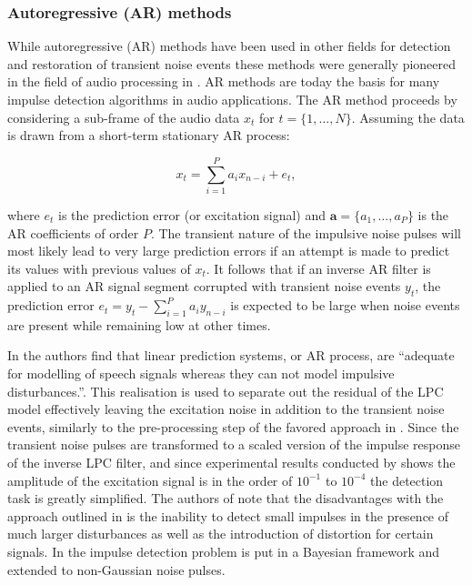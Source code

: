 \subsubsection{Autoregressive (AR) methods}
While autoregressive (AR) methods have been used in other fields for detection and restoration of transient noise events \cite{Arakawa1986} these methods were generally pioneered in the field of audio processing in \cite{Vaseghi1988thesis}\cite{Vaseghi1988}\cite{Vaseghi1990}. AR methods are today the basis for many impulse detection algorithms in audio applications\cite{Karjalainen1997}\cite{Esquef2000}\cite{Haermae2000}\cite{Esquef2002}\cite{Kauppinen2002}\cite{Wolfe2005}\cite{Subramanya2007}. The AR method proceeds by considering a sub-frame of the audio data $x_t$ for $ t = \{ 1, \ldots, N \}$. Assuming the data is drawn from a short-term stationary AR process:

\begin{equation}\label{eq:ARmodel}
x_t = \sum_{i=1}^P a_i x_{n-i} + e_t,
\end{equation}

where $e_t$ is the prediction error (or excitation signal) and $\mathbf{a} = \{a_1,\ldots,a_P\}$ is the AR coefficients of order $P$. The transient nature of the impulsive noise pulses will most likely lead to very large prediction errors if an attempt is made to predict its values with previous values of $x_t$. It follows that if an inverse AR filter is applied to an AR signal segment corrupted with transient noise events $y_t$, the prediction error $e_t = y_t - \sum_{i=1}^P a_i y_{n-i}$ is expected to be large when noise events are present while remaining low at other times\cite{Godsill1998book}.

In \cite{Vaseghi1990} the authors find that linear prediction systems, or AR process, are ``adequate for modelling of speech signals whereas they can not model impulsive disturbances.''. This realisation is used to separate out the residual of the LPC model effectively leaving the excitation noise in addition to the transient noise events, similarly to the pre-processing step of the favored approach in \cite{Kauppinen2002}. Since the transient noise pulses are transformed to a scaled version of the impulse response of the inverse LPC filter, and since experimental results conducted by \cite{Vaseghi1990} shows the amplitude of the excitation signal is in the order of $10^{-1}$ to $10^{-4}$ the detection task is greatly simplified. The authors of \cite{Godsill1998} note that the disadvantages with the approach outlined in \cite{Vaseghi1990} is the inability to detect small impulses in the presence of much larger disturbances as well as the introduction of distortion for certain signals. In \cite{Godsill1998} the impulse detection problem is put in a Bayesian framework and extended to non-Gaussian noise pulses.

